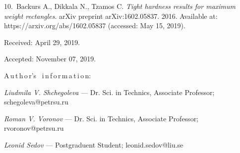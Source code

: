 {10.~Backurs A., Dikkala N., Tzamos C. {\it Tight hardness results
for maximum weight rectangles}. arXiv preprint arXiv:1602.05837.
2016. Available at: https://arxiv.org/abs/1602.05837 (accessed:
May 15, 2019).

\vskip 1.5mm

%


Received:  April 29, 2019.

Accepted: November 07, 2019.

\vskip 4.5mm%
A\,u\,t\,h\,o\,r's \ i\,n\,f\,o\,r\,m\,a\,t\,i\,o\,n:

\vskip 1.5mm%
\textit{Liudmila V. Shchegoleva} --- Dr. Sci. in Technics,
Associate Professor; schegoleva@petrsu.ru

\vskip 1.5mm%
\textit{Roman V. Voronov} --- Dr. Sci. in Technics, Associate
Professor; rvoronov@petrsu.ru

\vskip 1.5mm%
\textit{Leonid Sedov} --- Postgraduent Student;
leonid.sedov@liu.se

}
